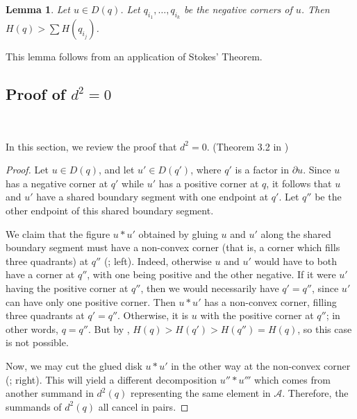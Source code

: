 \documentclass[a4paper,final, reqno]{amsart}
\theoremstyle{plain}
\newtheorem{Lemma}[Th]{Lemma}
\theoremstyle{definition}
\newcommand{\A}{\mathcal{A}}
\begin{document}
	\begin{Lemma}\label{lem:height}
		Let $u\in D(q)$. Let $q_{i_1}, \dots, q_{i_k}$ be the negative corners of $u$. Then $H(q) > \sum H(q_{i_j})$.
	\end{Lemma}
		
	This lemma follows from an application of Stokes' Theorem.
	
	
	
	
	
	
	
	\subsection{Proof of $d^2=0$}
	
	\-\
	
	In this section, we review the proof that $d^2=0$. (Theorem 3.2 in \cite{Chekanov})
	
	
		
	\begin{proof}
		Let $u\in D(q)$, and let $u' \in D(q')$, where $q'$ is a factor in $\partial u$. Since $u$ has a negative corner at $q'$ while $u'$ has a positive corner at $q$, it follows that $u$ and $u'$ have a shared boundary segment with one endpoint at $q'$. Let $q''$ be the other endpoint of this shared boundary segment. %
		
		
		We claim that the figure $u*u'$ obtained by gluing $u$ and $u'$ along the shared boundary segment must have a non-convex corner (that is, a corner which fills three quadrants) at $q''$ (; left). Indeed, otherwise $u$ and $u'$ would have to both have a corner at $q''$, with one being positive and the other negative. If it were $u'$ having the positive corner at $q''$, then we would necessarily have $q'=q''$, since $u'$ can have only one positive corner. Then $u*u'$ has a non-convex corner, filling three quadrants at $q'=q''$. Otherwise, it is $u$ with the positive corner at $q''$; in other words, $q=q''$. But by , $H(q) > H(q') > H(q'') = H(q)$, so this case is not possible.
		
		
		
		
		
		Now, we may cut the glued disk $u*u'$ in the other way at the non-convex corner (; right). This will yield a different decomposition $u''*u'''$ which comes from another summand in $d^2(q)$ representing the same element in $\A$. Therefore, the summands of $d^2(q)$ all cancel in pairs. 
	\end{proof}
	
\end{document}
